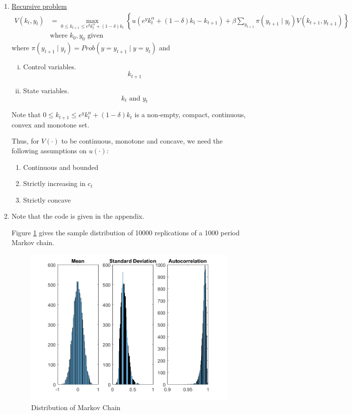 \documentclass[12pt]{article}
\theoremstyle{definition}
\begin{document}
\begin{enumerate}[1.]
	\item 
	
	\underline{Recursive problem}
	\begin{align*}
	V( k_{t}, y_t) & = \max_{0\leq  k_{t+1} \leq e^yk_t^\alpha + (1-\delta)k_t}   \left\lbrace u( e^yk_t^\alpha +  (1-\delta)k_t - k_{t+1}) + \beta \sum_{y_{t+1}} \pi(y_{t+1}\mid y_t) V(k_{t+1},y_{t+1})\right\rbrace \\
	&\text{where } k_0, y_0 \text{ given}
	\end{align*}
	where $\pi(y_{t+1}\mid y_t) = Prob(y=y_{t+1}\mid y=y_t)$ and
	\begin{enumerate}[(i)]
	\item Control variables.
	\[
	k_{t+1}
	\]
	\item State variables.
	\[
	k_{t} \text{ and } y_{t}
	\]
\end{enumerate}
	
	Note that $0\leq  k_{t+1} \leq e^yk_t^\alpha + (1-\delta)k_t$ is a non-empty, compact, continuous, convex and monotone set.
	
	Thus, for $V(\cdot)$ to be continuous, monotone and concave, we need the following assumptions on $u(\cdot)$:
	\begin{enumerate}
		\item Continuous and bounded
		\item Strictly increasing in $c_t$
		\item Strictly concave
	\end{enumerate}
	
	\item 
	
	Note that the code is given in the appendix.
	
	Figure \ref{fig:plotmarkov} gives the sample distribution of 10000 replications of a 1000 period Markov chain.
	\begin{figure}[H]
		\centering
		\includegraphics[width=\linewidth]{plot_markov}
		\caption{Distribution of Markov Chain}
		\label{fig:plotmarkov}
	\end{figure}


\end{enumerate}
\end{document}
